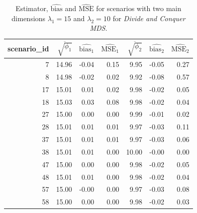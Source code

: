 \documentclass[11pt]{report}
\begin{document}
\begin{table}[ht]
\centering
\begin{tabular}{rrrrrrr}
 scenario\_id & $\overline{\sqrt{\phi_1}}$ & $\widehat{\mbox{bias}_1}$ & $\widehat{\mbox{MSE}_1}$ & $\overline{\sqrt{\phi_2}}$ & $\widehat{\mbox{bias}_2}$ & $\widehat{\mbox{MSE}_2}$ \\ 
  \hline
 7 & 14.96 & -0.04 & 0.15 & 9.95 & -0.05 & 0.27 \\ 
 8 & 14.98 & -0.02 & 0.02 & 9.92 & -0.08 & 0.57 \\ 
 17 & 15.01 & 0.01 & 0.02 & 9.98 & -0.02 & 0.05 \\ 
 18 & 15.03 & 0.03 & 0.08 & 9.98 & -0.02 & 0.04 \\ 
 27 & 15.00 & 0.00 & 0.00 & 9.99 & -0.01 & 0.02 \\ 
 28 & 15.01 & 0.01 & 0.01 & 9.97 & -0.03 & 0.11 \\ 
 37 & 15.01 & 0.01 & 0.01 & 9.97 & -0.03 & 0.06 \\ 
 38 & 15.01 & 0.01 & 0.00 & 10.00 & -0.00 & 0.00 \\ 
 47 & 15.00 & 0.00 & 0.00 & 9.98 & -0.02 & 0.05 \\ 
 48 & 15.01 & 0.01 & 0.00 & 9.98 & -0.02 & 0.04 \\ 
 57 & 15.00 & -0.00 & 0.00 & 9.97 & -0.03 & 0.08 \\ 
 58 & 15.00 & 0.00 & 0.00 & 9.98 & -0.02 & 0.03 \\ 
   \hline
\end{tabular}
\caption{Estimator, $\widehat{\mbox{bias}}$ and $\widehat{\mbox{MSE}}$ for scenarios with two main dimensions $\lambda_1 = 15$ and $\lambda_2 = 10$ for \textit{Divide and Conquer MDS}.}
\end{table}

\FloatBarrier
\end{document}
